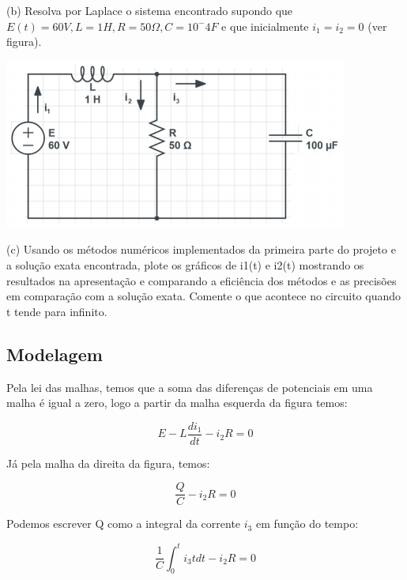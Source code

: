 \documentclass[12pt]{article}%
\begin{document}
    (b) Resolva por Laplace o sistema encontrado supondo que \(E(t) = 60V, L = 1H, R = 50\Omega, C = 10^-4 F\) e que inicialmente \(i_{1} = i_{2} = 0\) (ver figura).

    \begin{center}
        \includegraphics[scale=1.0]{problemas/p2b.png}
    \end{center}
    
    (c) Usando os métodos numéricos implementados da primeira parte do projeto e a solução exata
encontrada, plote os gráficos de i1(t) e i2(t) mostrando os resultados na apresentação e comparando a
eficiência dos métodos e as precisões em comparação com a solução exata. Comente o que acontece no
circuito quando t tende para infinito.

    \subsection{Modelagem}
    Pela lei das malhas, temos que a soma das diferenças de potenciais em uma malha é igual a zero, logo a partir da malha esquerda da figura temos:
    
    \begin{equation}
        E - L\frac{di_{1}}{dt} - i_{2}R = 0
        \label{p2_eq6}
    \end{equation}
    
    Já pela malha da direita da figura, temos:
    
    \begin{equation}
        \frac{Q}{C} - i_{2}R = 0
        \label{p2_eq7}
    \end{equation}
    
    Podemos escrever Q como a integral da corrente \(i_{3}\) em função do tempo:
    
    \begin{equation}
        \frac{1}{C} \int_{0}^{t} i_{3}tdt - i_{2}R = 0
        \label{p2_eq8}
    \end{equation}
    
\end{document}

